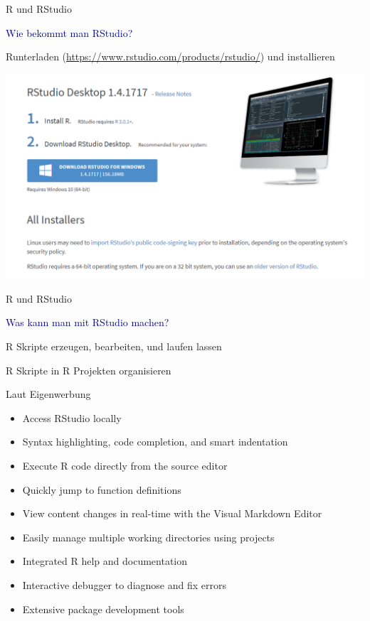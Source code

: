 \documentclass[
  8pt,
  ignorenonframetext,
]{beamer}
\providecommand{\tightlist}{%
  \setlength{\itemsep}{0pt}\setlength{\parskip}{0pt}}
\begin{document}
\begin{frame}{R und RStudio}
\protect\hypertarget{r-und-rstudio-5}{}
\large

\textcolor{darkblue}{Wie bekommt man RStudio?} \vspace{1mm}

Runterladen (\url{https://www.rstudio.com/products/rstudio/}) und
installieren \vspace{2mm}

\begin{center}\includegraphics[width=0.8\linewidth]{2_Abbildungen/pds_2_rstudio_download} \end{center}
\end{frame}

\begin{frame}{R und RStudio}
\protect\hypertarget{r-und-rstudio-6}{}
\vspace{2mm}
\large

\textcolor{darkblue}{Was kann man mit RStudio machen?} \normalsize

R Skripte erzeugen, bearbeiten, und laufen lassen

R Skripte in R Projekten organisieren

Laut Eigenwerbung

\small

\begin{itemize}
\tightlist
\item
  Access RStudio locally
\item
  Syntax highlighting, code completion, and smart indentation
\item
  Execute R code directly from the source editor
\item
  Quickly jump to function definitions
\item
  View content changes in real-time with the Visual Markdown Editor
\item
  Easily manage multiple working directories using projects
\item
  Integrated R help and documentation
\item
  Interactive debugger to diagnose and fix errors
\item
  Extensive package development tools
\end{itemize}
\end{frame}
\end{document}
